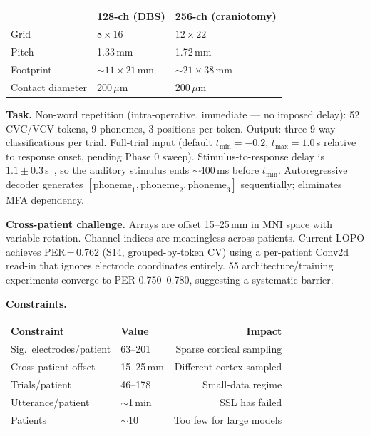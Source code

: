 \documentclass[11pt,letterpaper]{article}
\begin{document}
\begin{table}[ht!]\centering\small
\begin{tabular}{@{}lll@{}}
\toprule
& \textbf{128-ch (DBS)} & \textbf{256-ch (craniotomy)} \\
\midrule
Grid & $8 \times 16$ & $12 \times 22$ \\
Pitch & 1.33\,mm & 1.72\,mm \\
Footprint & ${\sim}11 \times 21$\,mm & ${\sim}21 \times 38$\,mm \\
Contact diameter & 200\,$\mu$m & 200\,$\mu$m \\
\bottomrule
\end{tabular}
\end{table}

\textbf{Task.} Non-word repetition (intra-operative, immediate --- no imposed delay): 52 CVC/VCV tokens, 9 phonemes, 3 positions per token. Output: three 9-way classifications per trial. Full-trial input (default $t_{\min}{=}{-}0.2$, $t_{\max}{=}1.0$\,s relative to response onset, pending Phase 0 sweep). Stimulus-to-response delay is $1.1 \pm 0.3$\,s~\cite{duraivel2023}, so the auditory stimulus ends ${\sim}$400\,ms before $t_{\min}$. Autoregressive decoder generates $[\text{phoneme}_1, \text{phoneme}_2, \text{phoneme}_3]$ sequentially; eliminates MFA dependency.

\textbf{Cross-patient challenge.} Arrays are offset 15--25\,mm in MNI space with variable rotation. Channel indices are meaningless across patients. Current LOPO achieves PER\,=\,0.762 (S14, grouped-by-token CV) using a per-patient Conv2d read-in that ignores electrode coordinates entirely. 55 architecture/training experiments converge to PER 0.750--0.780, suggesting a systematic barrier.

\textbf{Constraints.}

\begin{table}[ht!]\centering\small
\begin{tabular}{@{}llr@{}}
\toprule
\textbf{Constraint} & \textbf{Value} & \textbf{Impact} \\
\midrule
Sig.\ electrodes/patient & 63--201 & Sparse cortical sampling \\
Cross-patient offset & 15--25\,mm & Different cortex sampled \\
Trials/patient & 46--178 & Small-data regime \\
Utterance/patient & ${\sim}$1\,min & SSL has failed \\
Patients & ${\sim}$10 & Too few for large models \\
\bottomrule
\end{tabular}
\end{table}
\end{document}
